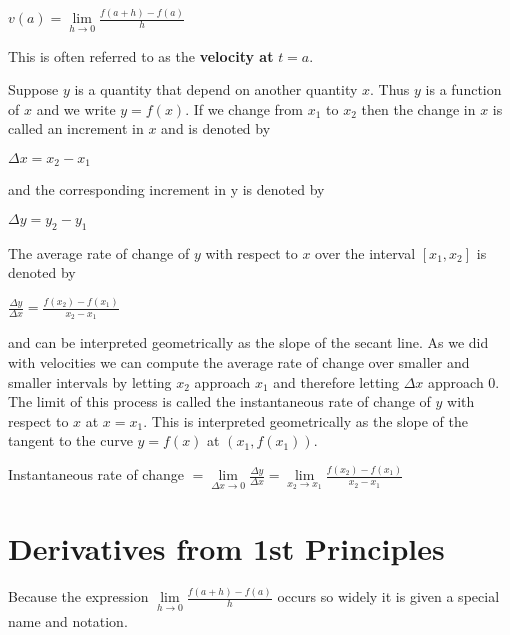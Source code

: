 \begin{center}
$v (a) =\underset{h \rightarrow 0}{\lim }\frac{f (a +h) -f (a)}{h}$
\end{center}\par
This is often referred to as the \textbf{velocity at} $t=a$. 

Suppose $y$ is a quantity that depend on another quantity $x$. Thus $y$ is a function of $x$ and we write $y =f (x)$. If we change from $x_{1}$ to $x_{2}$ then the change in $x$ is called an increment in $x$ and is denoted by 

\begin{center}
$ \Delta x =x_{2} -x_{1}$
\end{center}\par
and the corresponding increment in y is denoted by 

\begin{center}
$ \Delta y =y_{2} -y_{1}$
\end{center}\par
The average rate of change of $y$ with respect to $x$ over the interval $\left [x_{1} ,x_{2}\right ]$ is denoted by 

\begin{center}
$\frac{ \Delta y}{ \Delta x} =\frac{f (x_{2}) -f (x_{1})}{x_{2} -x_{1}}$
\end{center}\par
and can be interpreted geometrically as the slope of the secant line. As we did with velocities we can compute the average rate of change over smaller and smaller intervals by letting $x_{2}$ approach $x_{1}$ and therefore letting $ \Delta x$ approach $0$. The limit of this process is called the instantaneous rate of change of $y$ with respect to $x$ at $x =x_{1}$. This is interpreted geometrically as the slope of the tangent to the curve $y =f (x)$ at $(x_{1} ,f (x_{1}))$. 

\begin{tcolorbox}
\begin{center}
Instantaneous rate of change $ =\underset{ \Delta x \rightarrow 0}{\lim }\frac{ \Delta y}{ \Delta x} =\underset{x_{2} \rightarrow x_{1}}{\lim }\frac{f (x_{2}) -f (x_{1})}{x_{2} -x_{1}}$
\end{center}
\end{tcolorbox}


\section{Derivatives from 1st Principles}
Because the expression $\underset{h \rightarrow 0}{\lim }\frac{f (a +h) -f (a)}{h}$ occurs so widely it is given a special name and notation. 

